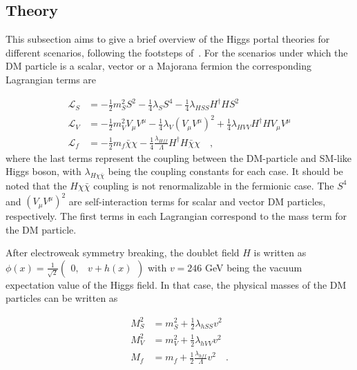 \subsection{Theory}
\label{subsec:higgs_portal_theory}

This subsection aims to give a brief overview of the Higgs portal theories for different scenarios, following the footsteps of~\cite{Djouadi:2011aa}.
For the scenarios under which the DM particle is a scalar, vector or a Majorana fermion the corresponding Lagrangian terms are 

\begin{equation}
    \begin{split}
        \mathcal{L}_{S} &= -\frac{1}{2} m_{S}^{2} S^{2} - \frac{1}{4} \lambda_{S} S^{4} - \frac{1}{4} \lambda_{HSS} H^{\dag} H S^{2} \\
        \mathcal{L}_{V} &= -\frac{1}{2} m_{V}^{2} V_{\mu} V^{\mu} - \frac{1}{4} \lambda_{V} (V_{\mu} V^{\mu})^{2} + \frac{1}{4} \lambda_{HVV} H^{\dag} H V_{\mu} V^{\mu} \\
        \mathcal{L}_{f} &= -\frac{1}{2} m_{f} \bar{\chi} \chi - \frac{1}{4} \frac{\lambda_{Hff}}{\Lambda} H^{\dag} H \bar{\chi} \chi \quad ,
    \end{split}
    \label{eq:higgs_portal_lagrangians}
\end{equation}
where the last terms represent the coupling between the DM-particle and SM-like Higgs boson, with $\lambda_{H\chi\bar{\chi}}$ being the coupling constants for each case.
It should be noted that the $H\chi\bar{\chi}$ coupling is not renormalizable in the fermionic case. The $S^{4}$ and $(V_{\mu} V^{\mu})^{2}$ are self-interaction terms
for scalar and vector DM particles, respectively. The first terms in each Lagrangian correspond to the mass term for the DM particle.

After electroweak symmetry breaking, the doublet field $H$ is written as $\phi(x) = \frac{1}{\sqrt{2}} \begin{pmatrix} 0, & v + h(x) \end{pmatrix}$ with $v = 246$ GeV
being the vacuum expectation value of the Higgs field. In that case, the physical masses of the DM particles can be written as~\cite{Djouadi:2011aa}

\begin{equation}
    \begin{split}
        M_{S}^2 &= m_{S}^2 + \frac{1}{2} \lambda_{hSS} v^{2} \\
        M_{V}^2 &= m_{V}^2 + \frac{1}{2} \lambda_{hVV} v^{2} \\
        M_{f}   &= m_{f}   + \frac{1}{2} \frac{\lambda_{hff}}{\Lambda} v^{2} \quad .
    \end{split}
\end{equation}

